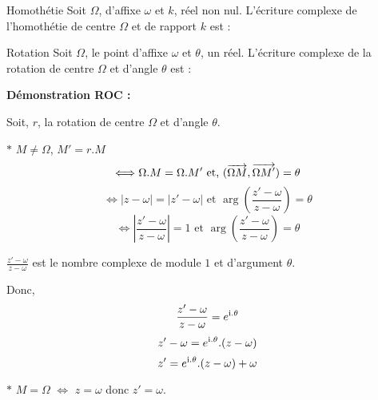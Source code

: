 \medskip

\begin{bclogo}{Homothétie}
Soit $\Omega$, d'affixe $\omega$ et $k$, réel non nul. L'écriture complexe de l'homothétie de centre $\Omega$ et de rapport $k$ est  : 
\end{bclogo}

\medskip

\begin{bclogo}{Rotation}
Soit $\Omega$, le point d'affixe $\omega$ et $\theta$, un réel. L'écriture complexe de la rotation de centre $\Omega$ et d'angle $\theta$ est : 

\textbf{Démonstration ROC :}

Soit, $r$, la rotation de centre $\Omega$ et d'angle $\theta$.

$\ast$ $M\neq \Omega$, $M'=r.M$ \[\Longleftrightarrow \Omega .M=\Omega .M' \text{ et, } (\overrightarrow{\Omega M},\overrightarrow{\Omega M'})=\theta\]
\[\Longleftrightarrow |z-\omega|=|z'-\omega| \text{ et } \arg \left( \frac{z'-\omega}{z-\omega}\right) =\theta\]
\[\Longleftrightarrow |\frac{z'-\omega}{z-\omega}|=1 \text{ et } \arg \left( \frac{z'-\omega}{z-\omega}\right) =\theta\]

$\frac{z'-\omega}{z-\omega}$ est le nombre complexe de module $1$ et d'argument $\theta$.

Donc, \[\frac{z'-\omega}{z-\omega}=e^{\mathrm{i} .\theta}\]
\[z'-\omega = e^{\mathrm{i} .\theta}.(z-\omega )\]
\[z'=e^{\mathrm{i} .\theta}.(z-\omega )+\omega\]

$\ast$ $M=\Omega$ $\Longleftrightarrow$ $z=\omega$ donc $z'=\omega$.
\end{bclogo}

